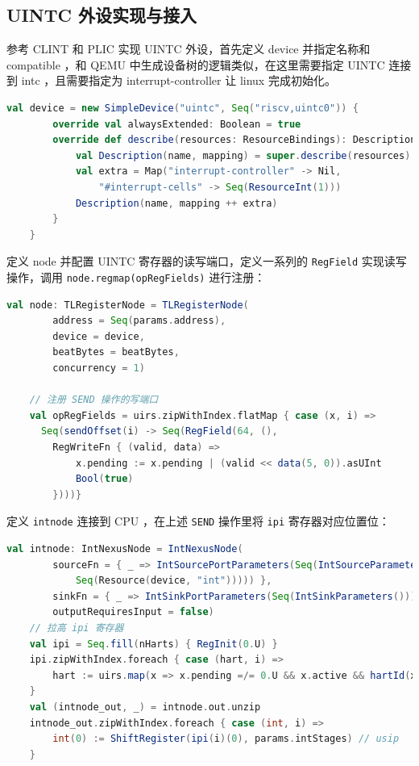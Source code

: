 \subsection{UINTC 外设实现与接入}

参考 CLINT 和 PLIC 实现 UINTC 外设，首先定义 device 并指定名称和 compatible ，和 QEMU 中生成设备树的逻辑类似，在这里需要指定 UINTC 连接到 intc ，且需要指定为 interrupt-controller 让 linux 完成初始化。

\begin{lstlisting}[style=CStyle,language=scala]
    val device = new SimpleDevice("uintc", Seq("riscv,uintc0")) {
        override val alwaysExtended: Boolean = true
        override def describe(resources: ResourceBindings): Description = {
            val Description(name, mapping) = super.describe(resources)
            val extra = Map("interrupt-controller" -> Nil,
                "#interrupt-cells" -> Seq(ResourceInt(1)))
            Description(name, mapping ++ extra)
        }
    }
\end{lstlisting}

定义 node 并配置 UINTC 寄存器的读写端口，定义一系列的 \texttt{RegField} 实现读写操作，调用 \texttt{node.regmap(opRegFields)} 进行注册：

\begin{lstlisting}[style=CStyle,language=scala]
    val node: TLRegisterNode = TLRegisterNode(
        address = Seq(params.address),
        device = device,
        beatBytes = beatBytes,
        concurrency = 1)

    // 注册 SEND 操作的写端口
    val opRegFields = uirs.zipWithIndex.flatMap { case (x, i) =>
      Seq(sendOffset(i) -> Seq(RegField(64, (),
        RegWriteFn { (valid, data) =>
            x.pending := x.pending | (valid << data(5, 0)).asUInt
            Bool(true)
        })))}
\end{lstlisting}

定义 \texttt{intnode} 连接到 CPU ，在上述 \texttt{SEND} 操作里将 \texttt{ipi} 寄存器对应位置位：

\begin{lstlisting}[style=CStyle,language=scala]
    val intnode: IntNexusNode = IntNexusNode(
        sourceFn = { _ => IntSourcePortParameters(Seq(IntSourceParameters(1,
            Seq(Resource(device, "int"))))) },
        sinkFn = { _ => IntSinkPortParameters(Seq(IntSinkParameters())) },
        outputRequiresInput = false)
    // 拉高 ipi 寄存器
    val ipi = Seq.fill(nHarts) { RegInit(0.U) }
    ipi.zipWithIndex.foreach { case (hart, i) =>
        hart := uirs.map(x => x.pending =/= 0.U && x.active && hartId(x.hartid) === i.asUInt).reduce(_ || _)
    }
    val (intnode_out, _) = intnode.out.unzip
    intnode_out.zipWithIndex.foreach { case (int, i) =>
        int(0) := ShiftRegister(ipi(i)(0), params.intStages) // usip
    }
\end{lstlisting}

